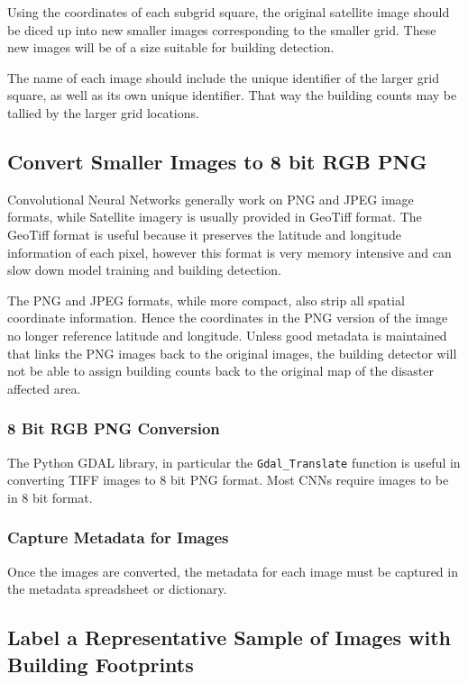 \documentclass[12pt, a4paper, oneside, headinclude, footinclude]{article}
\begin{document}
Using the coordinates of each subgrid square, the original satellite image should be diced up into new smaller images corresponding to the smaller grid. These new images will be of a size suitable for building detection.

The name of each image should include the unique identifier of the larger grid square, as well as its own unique identifier. That way the building counts may be tallied by the larger grid locations. 

\subsection{Convert Smaller Images to 8 bit RGB PNG}

Convolutional Neural Networks generally work on PNG and JPEG image formats, while Satellite imagery is usually provided in GeoTiff format. The GeoTiff format is useful because it preserves the latitude and longitude information of each pixel, however this format is very memory intensive and can slow down model training and building detection.

The PNG and JPEG formats, while more compact, also strip all spatial coordinate information. Hence the coordinates in the PNG version of the image no longer reference latitude and longitude. Unless good metadata is maintained that links the PNG images back to the original images, the building detector will not be able to assign building counts back to the original map of the disaster affected area. 

\subsubsection{8 Bit RGB PNG Conversion}

The Python GDAL library, in particular the \texttt{Gdal_Translate}
function is useful in converting TIFF images to 8 bit PNG format. Most CNNs
require images to be in 8 bit format.

\subsubsection{Capture Metadata for Images}

Once the images are converted, the metadata for each image must be captured
in the metadata spreadsheet or dictionary.

\subsection{Label a Representative Sample of Images with Building Footprints}
\end{document}
